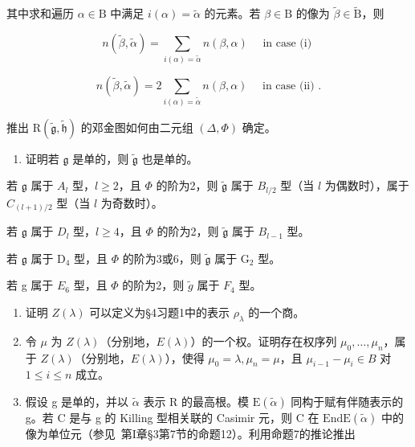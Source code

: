 其中求和遍历 \(\alpha \in \mathrm{B}\) 中满足 \(i(\alpha) = \tilde{\alpha}\) 的元素。若 \(\beta \in \mathrm{B}\) 的像为 \(\tilde{\beta} \in \tilde{\mathrm{B}}\)，则

\[
  n (\tilde {\beta}, \tilde {\alpha}) = \sum_ {i (\alpha) = \tilde {\alpha}} n (\beta , \alpha) \quad \text { in   case   (i) }
\]

\[
n (\tilde {\beta}, \tilde {\alpha}) = 2 \sum_ {i (\alpha) = \tilde {\alpha}} n (\beta , \alpha) \quad \text { in   case   (ii) }.
\]

推出 \(\mathrm{R}(\tilde{\mathfrak{g}},\tilde{\mathfrak{h}})\) 的邓金图如何由二元组 \((\varDelta,\varPhi)\) 确定。

\begin{enumerate}
\def\labelenumi{\alph{enumi})}
\setcounter{enumi}{2}
\tightlist
\item
  证明若 \(\mathfrak{g}\) 是单的，则 \(\tilde{\mathfrak{g}}\) 也是单的。
\end{enumerate}

若 \(\mathfrak{g}\) 属于 \(A_l\) 型，\(l \geq 2\)，且 \(\varPhi\) 的阶为2，则 \(\tilde{\mathfrak{g}}\) 属于 \(B_{l/2}\) 型（当 \(l\) 为偶数时），属于 \(C_{(l+1)/2}\) 型（当 \(l\) 为奇数时）。

若 \(\mathfrak{g}\) 属于 \(D_l\) 型，\(l \geq 4\)，且 \(\varPhi\) 的阶为2，则 \(\tilde{\mathfrak{g}}\) 属于 \(B_{l-1}\) 型。

若 \(\mathfrak{g}\) 属于 \(\mathrm{D}_4\) 型，且 \(\varPhi\) 的阶为3或6，则 \(\tilde{\mathfrak{g}}\) 属于 \(\mathrm{G}_2\) 型。

若 g 属于 \(E_{6}\) 型，且 \(\Phi\) 的阶为2，则 \(\tilde{g}\) 属于 \(F_{4}\) 型。


\begin{enumerate}
\def\labelenumi{\arabic{enumi})}
\item
  证明 \(Z(\lambda)\) 可以定义为§4习题1中的表示 \(\rho_{\lambda}\) 的一个商。
\item
  令 \(\mu\) 为 \(Z(\lambda)\)（分别地，\(E(\lambda)\)）的一个权。证明存在权序列 \(\mu_0, \ldots, \mu_n\)，属于 \(Z(\lambda)\)（分别地，\(E(\lambda)\)），使得 \(\mu_0 = \lambda, \mu_n = \mu\)，且 \(\mu_{i-1} - \mu_i \in B\) 对 \(1 \leq i \leq n\) 成立。
\item
  假设 g 是单的，并以 \(\tilde{\alpha}\) 表示 R 的最高根。模 \(\mathrm{E}(\tilde{\alpha})\) 同构于赋有伴随表示的 g。若 C 是与 g 的 Killing 型相关联的 Casimir 元，则 C 在 \(\mathrm{End}\mathrm{E}(\tilde{\alpha})\) 中的像为单位元（参见~第I章§3第7节的命题12）。利用命题7的推论推出
\end{enumerate}

